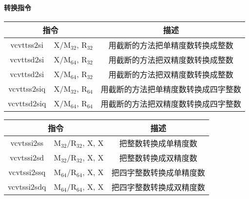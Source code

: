 \paragraph{转换指令}
\begin{table}[H]
    \centering
    \begin{tabular}{|c c|c|}
        \hline
        \multicolumn{2}{|c|}{\textbf{指令}} & \textbf{描述}                               \\
        \hline
        vcvttss2si                        & X/M$_{32}$, R$_{32}$ & 用截断的方法把单精度数转换成整数   \\
        \hline
        vcvttsd2si                        & X/M$_{64}$, R$_{32}$ & 用截断的方法把双精度数转换成整数   \\
        \hline
        vcvttsd2si                        & X/M$_{64}$, R$_{32}$ & 用截断的方法把双精度数转换成整数   \\
        \hline
        vcvttss2siq                       & X/M$_{32}$, R$_{64}$ & 用截断的方法把单精度数转换成四字整数 \\
        \hline
        vcvttsd2siq                       & X/M$_{64}$, R$_{64}$ & 用截断的方法把双精度数转换成四字整数 \\
        \hline
    \end{tabular}
\end{table}
\begin{table}[H]
    \centering
    \begin{tabular}{|c c|c|}
        \hline
        \multicolumn{2}{|c|}{\textbf{指令}} & \textbf{描述}                            \\
        \hline
        vcvtssi2ss                        & M$_{32}$/R$_{32}$, X, X & 把整数转换成单精度数   \\
        \hline
        vcvtssi2sd                        & M$_{32}$/R$_{32}$, X, X & 把整数转换成双精度数   \\
        \hline
        vcvtssi2ssq                       & M$_{64}$/R$_{64}$, X, X & 把四字整数转换成单精度数 \\
        \hline
        vcvtssi2sdq                       & M$_{64}$/R$_{64}$, X, X & 把四字整数转换成双精度数 \\
        \hline
    \end{tabular}
\end{table}
